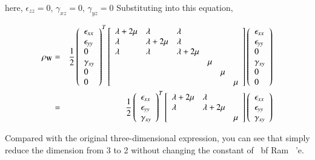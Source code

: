 here,
$\epsilon_{zz}=0$, $\gamma_{xz}=0$, $\gamma_{yz}=0$
Substituting into this equation,

\begin{eqnarray}
\rho_{\mathbf{W}}
&=& \frac{1}{2}\left(\begin{array}{l}
\epsilon_{xx}\\
\epsilon_{yy}\\
0\\
\gamma_{xy}\\
0\\
0
\end{array}\right)^T
\left[\begin{array}{llllll}
\lambda+2\mu & \lambda & \lambda\\
\lambda & \lambda+2\mu & \lambda\\
\lambda & \lambda & \lambda+2\mu\\
& & & \mu &    & \\
& & &     &\mu & \\
& & &     &    &\mu
\end{array}\right]
\left(\begin{array}{l}
\epsilon_{xx}\\
\epsilon_{yy}\\
0\\
\gamma_{xy}\\
0\\
0
\end{array}\right)\\
&=&
\frac{1}{2}\left(\begin{array}{l}
\epsilon_{xx}\\
\epsilon_{yy}\\
\gamma_{xy}
\end{array}\right)^T
\left[\begin{array}{lll}
\lambda+2\mu & \lambda & \\
\lambda & \lambda+2\mu &\\
& & \mu \\
\end{array}\right]
\left(\begin{array}{l}
\epsilon_{xx}\\
\epsilon_{yy}\\
\gamma_{xy}
\end{array}\right)
\end{eqnarray}


Compared with the original three-dimensional expression, you can see that simply reduce the dimension from 3 to 2 without changing the constant of {\ bf Ram \ 'e}.

